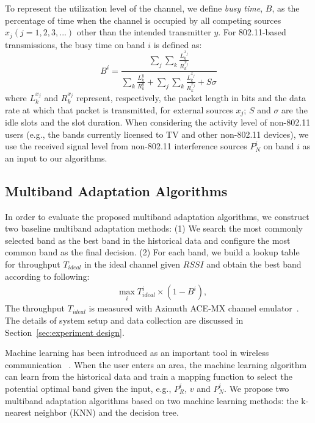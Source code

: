 To represent the utilization level of the channel, we define \emph{busy time}, $B$,
as the percentage of time when the channel is occupied by 
all competing sources $x_j ( j = 1, 2, 3, ...)$ other than the intended transmitter $y$. 
For 802.11-based transmissions, the busy time on band $i$ is defined as:
\begin{equation}
\label{eqn:80211activity}
B^i = \frac{\sum_j{\sum_k{\frac{L_k^{x_j}}{R_k^{x_j}}}}}{\sum_k{\frac{L_k^y}{R_k^y}}+\sum_j{\sum_k{\frac{L_k^{x_j}}{R_k^{x_j}}}}+S\sigma}
\end{equation}
where $L_k^{x_j}$ and $R_k^{x_j}$ represent, respectively, the packet length in bits and the data
rate at which that packet is transmitted, for external sources $x_j$;
$S$ and $\sigma$ are the idle slots and the slot duration. 
When considering the activity level of non-802.11 users 
(e.g., the bands currently licensed to TV and other non-802.11 devices), 
we use the received signal level from non-802.11 interference sources $P_N^i$ 
on band $i$ as an input to our algorithms. 

\subsection{Multiband Adaptation Algorithms}
In order to evaluate the proposed multiband adaptation algorithms, 
we construct two baseline multiband adaptation methods: (1) We search the
most commonly selected band as the best band in the historical data
and configure the most common band as the final decision. (2) For each band, we build 
a lookup table for throughput $T_{ideal}$ in the ideal channel given $RSSI$ and obtain 
the best band according to following:
\begin{align}
&\max_i T_{ideal}^i\times(1-B^i),
\label{eq:baseline2}
\end{align}
The throughput $T_{ideal}$ is measured with Azimuth ACE-MX channel emulator~\cite{AzimuthACE}. 
The details of system setup and data collection are discussed in Section~\ref{sec:experiment design}. 

Machine learning has been introduced as an important tool in wireless communication
~\cite{haykin2005cognitive}. When the user enters an area, the machine
learning algorithm can learn from the historical data and train a mapping 
function to select the potential optimal band given the input, e.g., $P_R^i$, $v$
and $P_N^i$. We propose two multiband adaptation algorithms based on
two machine learning methods: the k-nearest neighbor (KNN) and the decision tree.

